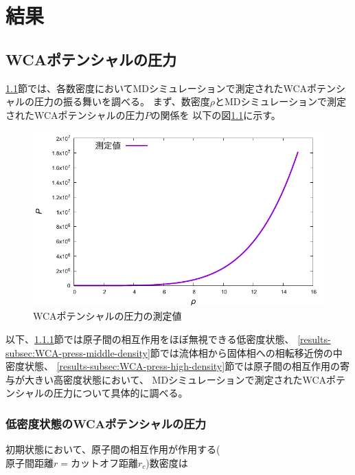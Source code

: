 \documentclass[titlepage]{jsreport}
\begin{document}
{{{\chapter{結果} \label{chap:results}

\section{WCAポテンシャルの圧力}\label{results-sec:WCA-press}
\ref{results-sec:WCA-press}節では、各数密度においてMDシミュレーションで測定されたWCAポテンシャルの圧力の振る舞いを調べる。
まず、数密度$\rho$とMDシミュレーションで測定されたWCAポテンシャルの圧力$P$の関係を
以下の図\ref{fig:den-pre}に示す。

\begin{figure}[htbp]
    \begin{center}
        \includegraphics[width=14cm]{fig/den-pre.pdf}
    \end{center}
    \caption{WCAポテンシャルの圧力の測定値}
    \label{fig:den-pre}
\end{figure}

以下、\ref{results-subsec:WCA-press-low-density}節では原子間の相互作用をほぼ無視できる低密度状態、
\ref{results-subsec:WCA-press-middle-density}節では流体相から固体相への相転移近傍の中密度状態、
\ref{results-subsec:WCA-press-high-density}節では原子間の相互作用の寄与が大きい高密度状態において、
MDシミュレーションで測定されたWCAポテンシャルの圧力について具体的に調べる。


\subsection{低密度状態のWCAポテンシャルの圧力}\label{results-subsec:WCA-press-low-density}
初期状態において、原子間の相互作用が作用する($原子間距離r=カットオフ距離r_c$)数密度は

}}}
\end{document}
